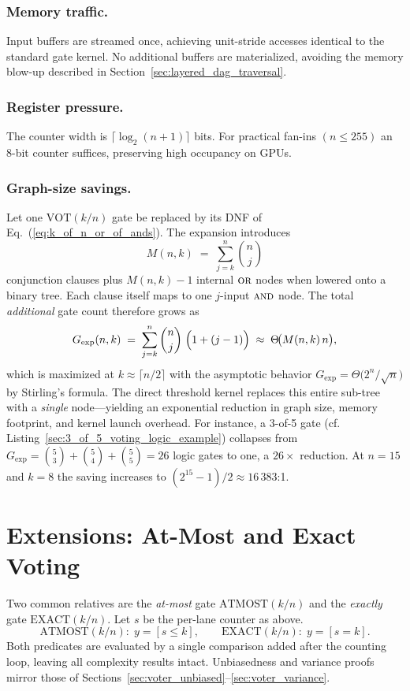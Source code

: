 \subsubsection{Memory traffic.}  Input buffers are streamed once, achieving
unit-stride accesses identical to the standard gate kernel.  No additional
buffers are materialized, avoiding the memory blow-up described in
Section~\ref{sec:layered_dag_traversal}.

\subsubsection{Register pressure.}  The counter width is $\lceil\log_2(n+1)\rceil$
bits.  For practical fan-ins $(n\le 255)$ an 8-bit counter suffices, preserving
high occupancy on GPUs.

\subsubsection{Graph-size savings.}  Let one $\mathrm{VOT}(k/n)$ gate be
replaced by its DNF of Eq.~(\ref{eq:k_of_n_or_of_ands}).  The expansion
introduces
\[
  M(n,k) \;=\; \sum_{j=k}^{n} \binom{n}{j}
\]
conjunction clauses plus $M(n,k)-1$ internal $\textsc{or}$ nodes when lowered
onto a binary tree.
Each clause itself maps to one $j$-input $\textsc{and}$ node.  The total
\emph{additional} gate count therefore grows as
\[
  G_{\text{exp}}(n,k) \;=\; \sum_{j=k}^{n} \binom{n}{j}\;\Bigl(1 + (j-1)\Bigr)
  \;\approx\; \Theta\!\bigl(M(n,k)\,n\bigr),
\]
which is maximized at $k\approx\lceil n/2\rceil$ with the asymptotic
behavior $G_{\text{exp}}=\Theta\!\bigl(2^{n}/\sqrt{n}\bigr)$ by Stirling’s
formula.  The direct threshold kernel replaces this entire sub-tree with a
\emph{single} node—yielding an exponential reduction in graph size, memory
footprint, and kernel launch overhead.  For instance, a 3-of-5 gate (cf.
Listing~\ref{sec:3_of_5_voting_logic_example}) collapses from
$G_{\text{exp}}=\binom{5}{3}+\binom{5}{4}+\binom{5}{5}=26$ logic gates to
one, a $26\times$ reduction.  At $n=15$ and $k=8$ the saving increases to
$(2^{15}-1)/2 \approx 16\,383$:1.

\section{Extensions: At-Most and Exact Voting}
\label{sec:voter_extensions}

Two common relatives are the \emph{at-most} gate $\mathrm{ATMOST}(k/n)$ and the
\emph{exactly} gate $\mathrm{EXACT}(k/n)$.  Let $s$ be the per-lane counter as
above.
\[
  \mathrm{ATMOST}(k/n):\; y=[s\le k],
  \qquad
  \mathrm{EXACT}(k/n):\; y=[s = k].
\]
Both predicates are evaluated by a single comparison added after the counting
loop, leaving all complexity results intact.  Unbiasedness and variance proofs
mirror those of Sections~\ref{sec:voter_unbiased}–\ref{sec:voter_variance}.

